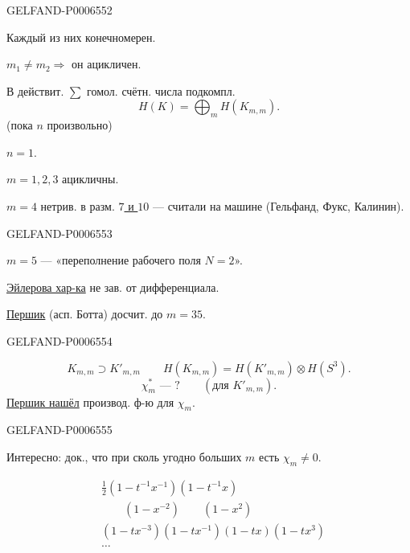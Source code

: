 \begin{GelfandAdjacentEvidence}{GELFAND-P000655}{2}


Каждый из них конечномерен.

\(m_1\ne m_2\Longrightarrow\) он ацикличен.

В действит. \(\sum\) гомол. счётн. числа подкомпл.
\[
H(K)=\bigoplus_m H(K_{m,m}).
\]
(пока \(n\) произвольно)

\underline{\(n=1\)}.

\(m=1,2,3\) ацикличны.

\underline{\(m=4\)} нетрив. в разм. \underline{\(7\) и \(10\)}
--- считали на машине (Гельфанд, Фукс, Калинин).
\end{GelfandAdjacentEvidence}
\begin{GelfandAdjacentEvidence}{GELFAND-P000655}{3}


\underline{\(m=5\)} --- «переполнение рабочего поля \(N=2\)».

\underline{Эйлерова хар-ка} не зав. от дифференциала.

\underline{Першик} (асп. Ботта) досчит. до \underline{\underline{\(m=35\)}}.
\end{GelfandAdjacentEvidence}
\begin{GelfandAdjacentEvidence}{GELFAND-P000655}{4}

\[
K_{m,m}\supset K'_{m,m}\qquad
H(K_{m,m})=H(K'_{m,m})\otimes H(S^3).
\]
\[
\chi_m^*\text{ --- ?}\qquad(\text{для }K'_{m,m}).
\]
\underline{Першик нашёл} производ. ф-ю для \(\chi_m\).
\end{GelfandAdjacentEvidence}
\begin{GelfandAdjacentEvidence}{GELFAND-P000655}{5}


Интересно: док., что при сколь угодно больших \(m\) есть \(\chi_m\ne0\).
\end{GelfandAdjacentEvidence}

\[
\begin{aligned}
&\tfrac12(1-t^{-1}x^{-1})(1-t^{-1}x)\\
&\qquad (1-x^{-2})\qquad (1-x^2)\\
&(1-tx^{-3})(1-tx^{-1})(1-tx)(1-tx^3)\\
&\ldots
\end{aligned}
\]


